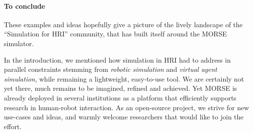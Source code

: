 \documentclass[conference]{IEEEtran}
\begin{document}
\paragraph*{To conclude}

These examples and ideas hopefully give a picture of the lively landscape of the
``Simulation for HRI'' community, that has built itself around the MORSE
simulator.

In the introduction, we mentioned how simulation in HRI had to address in
parallel constraints stemming from \emph{robotic simulation} and \emph{virtual
agent simulation}, while remaining a lightweight, easy-to-use tool. We are
certainly not yet there, much remains to be imagined, refined and achieved.
Yet MORSE is already deployed in several institutions as a platform that
efficiently supports research in human-robot interaction. As an open-source
project, we strive for new use-cases and ideas, and warmly welcome researchers
that would like to join the effort.





\end{document}
